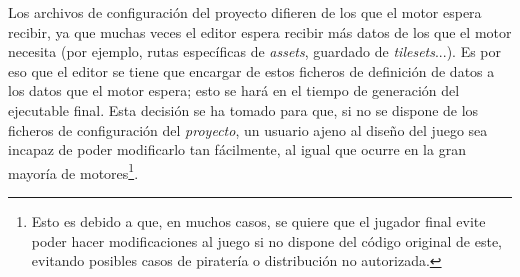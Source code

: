 \smallskip

Los archivos de configuración del proyecto difieren de los que el motor espera recibir, ya que muchas veces el editor espera recibir más datos de los que el motor necesita (por ejemplo, rutas específicas de \textit{assets}, guardado de \textit{tilesets}...). Es por eso que el editor se tiene que encargar de  estos ficheros de definición de datos a los datos que el motor espera; esto se hará en el tiempo de generación del ejecutable final. Esta decisión se ha tomado para que, si no se dispone de los ficheros de configuración del \textit{proyecto}, un usuario ajeno al diseño del juego sea incapaz de poder modificarlo tan fácilmente, al igual que ocurre en la gran mayoría de motores\footnote{Esto es debido a que, en muchos casos, se quiere que el jugador final evite poder hacer modificaciones al juego si no dispone del código original de este, evitando posibles casos de piratería o distribución no autorizada.}.
